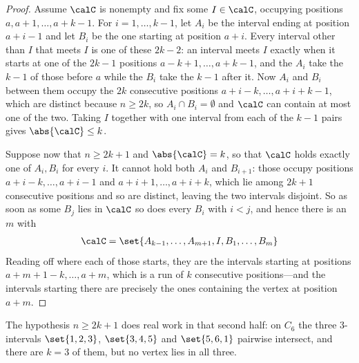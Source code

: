 \begin{proof}
    Assume $\calC$ is nonempty and fix some $I \in \calC$, occupying positions $a, a + 1, \ldots, a + k - 1$. For $i = 1, \ldots, k - 1$, let $A_i$ be the interval ending at position $a + i - 1$ and let $B_i$ be the one starting at position $a + i$. Every interval other than $I$ that meets $I$ is one of these $2k - 2$: an interval meets $I$ exactly when it starts at one of the $2k - 1$ positions $a - k + 1, \ldots, a + k - 1$, and the $A_i$ take the $k - 1$ of those before $a$ while the $B_i$ take the $k - 1$ after it. Now $A_i$ and $B_i$ between them occupy the $2k$ consecutive positions $a + i - k, \ldots, a + i + k - 1$, which are distinct because $n \geq 2k$, so $A_i \cap B_i = \emptyset$ and $\calC$ can contain at most one of the two. Taking $I$ together with one interval from each of the $k - 1$ pairs gives $\abs{\calC} \leq k$.

    Suppose now that $n \geq 2k + 1$ and $\abs{\calC} = k$, so that $\calC$ holds exactly one of $A_i, B_i$ for every $i$. It cannot hold both $A_i$ and $B_{i+1}$: those occupy positions $a + i - k, \ldots, a + i - 1$ and $a + i + 1, \ldots, a + i + k$, which lie among $2k + 1$ consecutive positions and so are distinct, leaving the two intervals disjoint. So as soon as some $B_j$ lies in $\calC$ so does every $B_i$ with $i < j$, and hence there is an $m$ with
    \begin{align*}
        \calC = \set{A_{k-1}, \ldots, A_{m+1}, I, B_1, \ldots, B_m}
    \end{align*}
    Reading off where each of those starts, they are the intervals starting at positions $a + m + 1 - k, \ldots, a + m$, which is a run of $k$ consecutive positions---and the intervals starting there are precisely the ones containing the vertex at position $a + m$.
\end{proof}

The hypothesis $n \geq 2k + 1$ does real work in that second half: on $C_6$ the three $3$-intervals $\set{1, 2, 3}$, $\set{3, 4, 5}$ and $\set{5, 6, 1}$ pairwise intersect, and there are $k = 3$ of them, but no vertex lies in all three.

